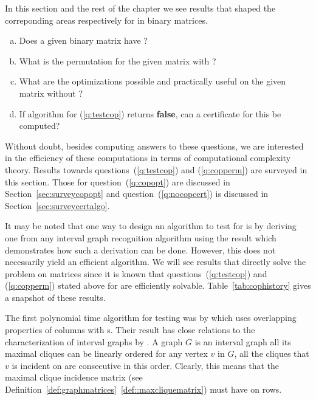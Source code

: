 In this section and the rest of the chapter we see results that shaped the
correponding areas respectively for \cop in binary matrices.

\begin{enumerate}[a.]
\singlespacing
\item \label{q:testcop} Does a given binary matrix have \COP?
\item \label{q:copperm} What is the \COP permutation for the given matrix with \COP?
\item \label{q:copopt} What are the optimizations possible and practically useful on
  the given matrix without \COP?
\item \label{q:nocopcert} If algorithm for (\ref{q:testcop}) returns
  \textbf{false}, can a certificate for this be computed?
\end{enumerate}

Without doubt, besides computing answers to these questions, we are
interested in the efficiency of these computations in terms of
computational complexity theory. Results towards
questions~(\ref{q:testcop}) and (\ref{q:copperm}) are surveyed in this
section. Those for question~(\ref{q:copopt}) are discussed in
Section~\ref{sec:surveycopopt} and question~(\ref{q:nocopcert}) is discussed
in Section~\ref{sec:surveycertalgo}.

It may be noted that one way to design an algorithm to test for \COP
is by deriving one from any interval graph recognition algorithm using
the result \cite{hmpv00} \cite[Th~2.7]{d08phd} which demonstrates how
such a derivation can be done. However, this does not necessarily
yield an efficient algorithm. We will see results that directly solve
the problem on matrices since it is known that
questions~(\ref{q:testcop}) and (\ref{q:copperm}) stated above for
\COP are efficiently solvable.  Table~\ref{tab:cophistory} gives a
snapshot of these results.

\tabcophistory

The first polynomial time algorithm for \COP testing was by
\cite{fg65} which uses overlapping properties of columns with \un
s. Their result has close relations to the characterization of
interval graphs by \cite{gh64}. A graph $G$ is an interval graph \iff
all its maximal cliques can be linearly ordered \stt for any vertex
$v$ in $G$, all the cliques that $v$ is incident on are consecutive in
this order. Clearly, this means that the maximal clique incidence
matrix (see
Definition~\ref{def:graphmatrices}~\ref{def::maxcliquematrix}) must
have \COP on rows.

